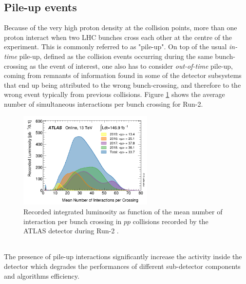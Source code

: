 \subsection{Pile-up events}
\label{chap2:LHC:PU}
Because of the very high proton density at the collision points, more than one proton interact when two LHC bunches cross each other at the centre of the experiment. This is commonly referred to as "pile-up". On top of the usual \textit{in-time} pile-up, defined as the collision events occurring during the same bunch-crossing as the event of interest, one also has to consider \textit{out-of-time} pile-up, coming from remnants of information found in some of the detector subsystems that end up being attributed to the wrong bunch-crossing, and therefore to the wrong event typically from previous collisions. Figure \ref{fig:chap2:LHC:PU} shows the average number of simultaneous interactions per bunch crossing for Run-2. \\
\begin{figure}[htbp]
    \centering
    \includegraphics[width=0.6\textwidth]{Ch2/Img/PU.png}
    \caption{Recorded integrated luminosity as function of the mean number of interaction per bunch crossing in $pp$ collisions recorded by the ATLAS detector during Run-2 \cite{Lumi2018}.}
    \label{fig:chap2:LHC:PU}
\end{figure}
\\
The presence of pile-up interactions significantly increase the activity inside the detector which degrades the performances of different sub-detector components and algorithms efficiency.
